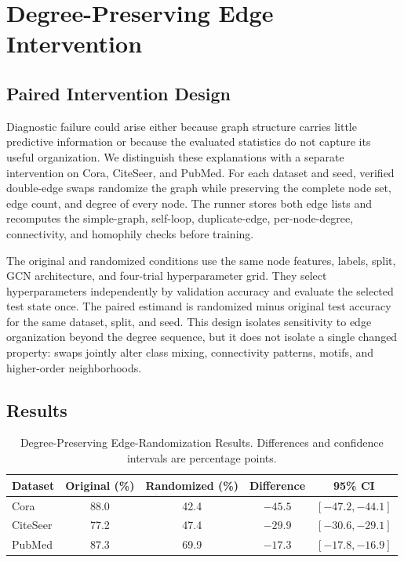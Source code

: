 \section{Degree-Preserving Edge Intervention}
\label{sec:edge_intervention}

\subsection{Paired Intervention Design}

Diagnostic failure could arise either because graph structure carries little predictive information or because the evaluated statistics do not capture its useful organization. We distinguish these explanations with a separate intervention on Cora, CiteSeer, and PubMed. For each dataset and seed, verified double-edge swaps randomize the graph while preserving the complete node set, edge count, and degree of every node. The runner stores both edge lists and recomputes the simple-graph, self-loop, duplicate-edge, per-node-degree, connectivity, and homophily checks before training.

The original and randomized conditions use the same node features, labels, split, GCN architecture, and four-trial hyperparameter grid. They select hyperparameters independently by validation accuracy and evaluate the selected test state once. The paired estimand is randomized minus original test accuracy for the same dataset, split, and seed. This design isolates sensitivity to edge organization beyond the degree sequence, but it does not isolate a single changed property: swaps jointly alter class mixing, connectivity patterns, motifs, and higher-order neighborhoods.

\subsection{Results}

\begin{table}[t]
\centering
\caption{Degree-Preserving Edge-Randomization Results. Differences and confidence intervals are percentage points.}
\label{tab:degree_intervention}
\small
\begin{tabular}{@{}lcccc@{}}
\toprule
Dataset & Original (\%) & Randomized (\%) & Difference & 95\% CI \\
\midrule
Cora & 88.0 & 42.4 & $-45.5$ & $[-47.2,-44.1]$ \\
CiteSeer & 77.2 & 47.4 & $-29.9$ & $[-30.6,-29.1]$ \\
PubMed & 87.3 & 69.9 & $-17.3$ & $[-17.8,-16.9]$ \\
\bottomrule
\end{tabular}
\end{table}

